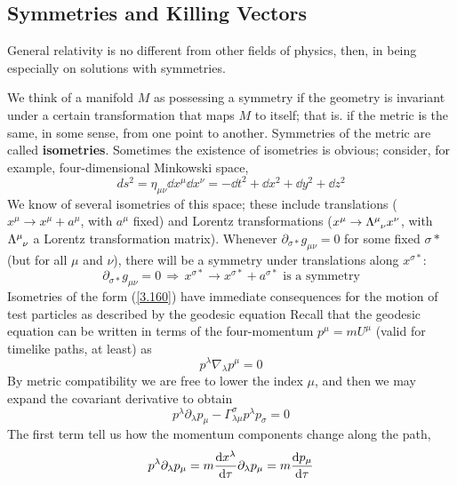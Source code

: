 \subsection{Symmetries and Killing Vectors}
General relativity is no different from other fields of physics, then, in being especially on solutions with symmetries.

We think of a manifold $M$ as possessing a symmetry if the geometry is invariant under a certain transformation that maps $M$ to itself; that is. if the metric is the same, in some sense, from one point to another. Symmetries of the metric are called \textbf{isometries}. Sometimes the existence of isometries is obvious; consider, for example, four-dimensional Minkowski space,
\begin{equation*}
    ds^2=\eta_{\mu\nu}\dd x^\mu\dd x^\nu=-\dd t^2+\dd x^2+\dd y^2+\dd z^2
\end{equation*}
We know of several isometries of this space; these include translations ($x^\mu\to x^\mu +a^\mu$, with $a^\mu$ fixed) and Lorentz transformations ($x^\mu\to \tensor{\Lambda}{^\mu_\nu}x^\nu$, with $\tensor{\Lambda}{^\mu_\nu}$ a Lorentz transformation matrix). Whenever $\partial_{\sigma*}g_{\mu\nu}=0$ for some fixed $\sigma*$ (but for all $\mu$ and $\nu$), there will be a symmetry under translations along $x^{\sigma*}$:
\begin{equation}\label{3.160}
    \partial_{\sigma*}g_{\mu\nu}=0\, \Rightarrow\, x^{\sigma*}\to x^{\sigma*}+a^{\sigma*}\text{ is a symmetry}
\end{equation}
Isometries of the form (\ref{3.160}) have immediate consequences for the motion of test particles as described by the geodesic equation Recall that the geodesic equation can be written in terms of the four-momentum $p^\mu=mU^\mu$ (valid for timelike paths, at least) as
\begin{equation*}
    p^\lambda\nabla_\lambda p^\mu=0
\end{equation*}
By metric compatibility we are free to lower the index $\mu$, and then we may expand the covariant derivative to obtain
\begin{equation*}
    p^\lambda\partial_\lambda p_\mu-\Gamma^\sigma_{\lambda\mu}p^\lambda p_\sigma=0
\end{equation*}
The first term tell us how the momentum components change along the path,
\begin{equation*}
    p^\lambda\partial_\lambda p_\mu=m\dv{x^\lambda}{\tau}\partial_\lambda p_\mu=m\dv{p_\mu}{\tau}
\end{equation*}
